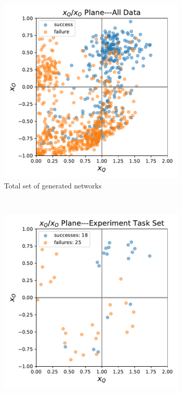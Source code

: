     \begin{figure}[tbp]
        \centering
        \begin{subfigure}[b]{0.80\linewidth}
            \centering
            \includegraphics[width=0.9\linewidth]{Figures/xQxO_Plane.pdf}
            \vfill
            \caption{Total set of generated networks}
            \label{fig:tot_set}
        \end{subfigure}%
        \\
        \begin{subfigure}[b]{0.80\linewidth}
            \centering
            \includegraphics[width=0.9\linewidth]{Figures/xQxO_plane_experiment_set.pdf}

\end{subfigure}
\end{figure}
